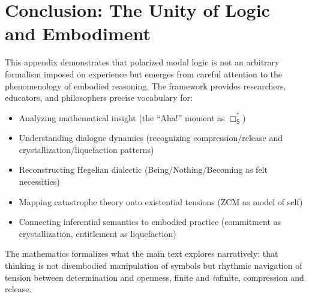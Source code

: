 \documentclass[12pt]{book}
\newcommand{\SBoxUp}{\Box_{\mathsf{S}}^{\uparrow}}
\begin{document}
\section{Conclusion: The Unity of Logic and Embodiment}

This appendix demonstrates that polarized modal logic is not an arbitrary formalism imposed on experience but emerges from careful attention to the phenomenology of embodied reasoning. The framework provides researchers, educators, and philosophers precise vocabulary for:

\begin{itemize}
\item Analyzing mathematical insight (the ``Aha!'' moment as $\SBoxUp$)
\item Understanding dialogue dynamics (recognizing compression/release and crystallization/liquefaction patterns)
\item Reconstructing Hegelian dialectic (Being/Nothing/Becoming as felt necessities)
\item Mapping catastrophe theory onto existential tensions (ZCM as model of self)
\item Connecting inferential semantics to embodied practice (commitment as crystallization, entitlement as liquefaction)
\end{itemize}

The mathematics formalizes what the main text explores narratively: that thinking is not disembodied manipulation of symbols but rhythmic navigation of tension between determination and openness, finite and \textit{in}finite, compression and release.


\printbibliography
\end{document}

